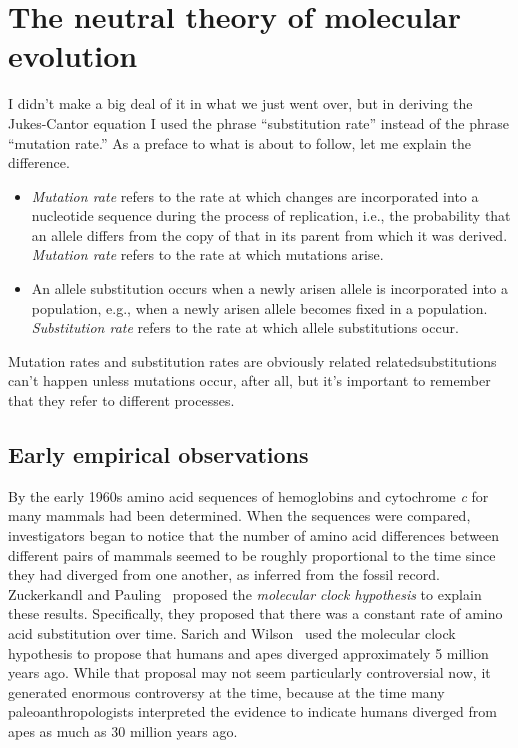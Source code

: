 \chapter{The neutral theory of molecular evolution}

I didn't make a big deal of it in what we just went over, but in
deriving the Jukes-Cantor equation I used the phrase ``substitution
rate'' instead of the phrase ``mutation rate.'' As a preface to what
is about to follow, let me explain the difference.

\begin{itemize}

\item {\it Mutation rate\/} refers to the rate at which changes are
  incorporated into a nucleotide sequence during the process of
  replication, i.e., the probability that an allele differs from the
  copy of that in its parent from which it was derived. {\it Mutation
    rate\/} refers to the rate at which mutations
  arise.

\item An allele substitution occurs when a newly arisen allele is
  incorporated into a population, e.g., when a newly arisen allele
  becomes fixed in a population. {\it Substitution rate\/} refers to
  the rate at which allele substitutions occur. 

\end{itemize}

\noindent Mutation rates and substitution rates are obviously related
related{\dash}substitutions can't happen unless mutations occur, after
all{\dash}, but it's important to remember that they refer to
different processes.

\section*{Early empirical observations}

By the early 1960s amino acid sequences of hemoglobins and cytochrome
{\it c\/} for many mammals had been determined. When the sequences
were compared, investigators began to notice that the number of amino
acid differences between different pairs of mammals seemed to be
roughly proportional to the time since they had diverged from one
another, as inferred from the fossil record. Zuckerkandl and
Pauling~\cite{Zuckerkandl-Pauling65} proposed the {\it molecular clock
hypothesis\/} to explain these results. Specifically, they proposed
that there was a constant rate of amino acid substitution over
time. Sarich and Wilson~\cite{Sarich-Wilson67,Wilson-Sarich69} used
the molecular clock hypothesis to propose that humans and apes
diverged approximately 5 million years ago. While that proposal may
not seem particularly controversial now, it generated enormous
controversy at the time, because at the time many paleoanthropologists
interpreted the evidence to indicate humans diverged from apes as much
as 30 million years ago.

